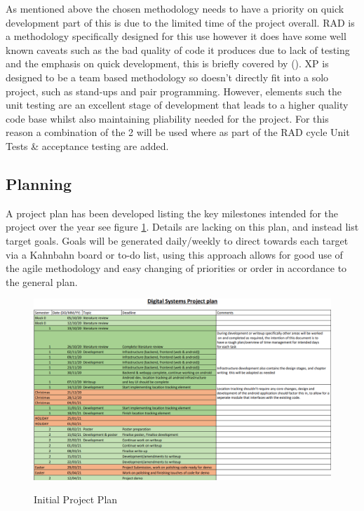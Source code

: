 As mentioned above the chosen methodology needs to have a priority on quick development part of this is due to the limited time of the project overall. RAD is a methodology specifically designed for this use however it does have some well known caveats such as the bad quality of code it produces due to lack of testing and the emphasis on quick development, this is briefly covered by (\cite{kissflow_2019_rapid}). XP is designed to be a team based methodology so doesn't directly fit into a solo project, such as stand-ups and pair programming. However, elements such the unit testing are an excellent stage of development that leads to a higher quality code base whilst also maintaining pliability needed for the project. For this reason a combination of the 2 will be used where as part of the RAD cycle Unit Tests \& acceptance testing are added.
\pagebreak
\subsection{Planning}
A project plan has been developed listing the key milestones intended for the project over the year see figure \ref{fig:projlan}. Details are lacking on this plan, and instead list target goals. Goals will be generated daily/weekly to direct towards each target via a Kahnbahn board or to-do list, using this approach allows for good use of the agile methodology and easy changing of priorities or order in accordance to the general plan.

\begin{figure}[h]
	\includegraphics[width=\linewidth]{./images/planning/projectplan.png}\\
	\caption{Initial Project Plan}
	\label{fig:projlan}
\end{figure}

